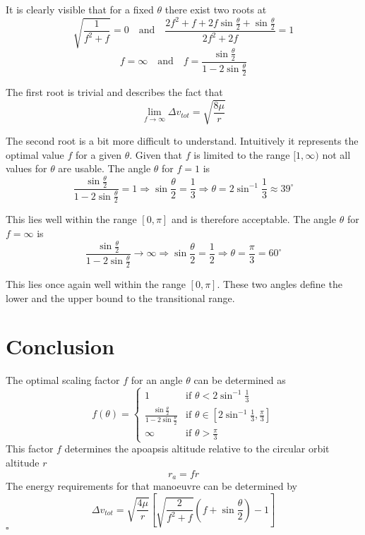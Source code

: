 \documentclass[a4paper, 11pt]{article}
\begin{document}
It is clearly visible that for a fixed $\theta$ there exist two roots at
$$\sqrt{\frac{1}{f^2+f}} = 0 \quad\text{and}\quad  \frac{2f^2+f+2f\sin\frac\theta 2 + \sin\frac\theta 2}{2f^2+2f} =1$$
$$f = \infty \quad \text{and} \quad f = \frac{\sin\frac\theta 2}{1-2\sin\frac\theta 2}$$

The first root is trivial and describes the fact that
$$\lim_{f\to\infty}\Delta v_{tot} = \sqrt{\frac{8\mu}{r}}$$

The second root is a bit more difficult to understand. Intuitively it represents the optimal value $f$ for a given $\theta$.
Given that $f$ is limited to the range $[1,\infty)$ not all values for $\theta$ are usable.
The angle $\theta$ for $f=1$ is
$$\frac{\sin\frac\theta 2}{1-2\sin\frac\theta 2} = 1 \Rightarrow \sin\frac\theta 2 = \frac13 \Rightarrow \theta = 2\sin^{-1}\frac13 \approx 39^\circ$$

This lies well within the range $[0,\pi]$ and is therefore acceptable. The angle $\theta$ for $f=\infty$ is
$$\frac{\sin\frac\theta 2}{1-2\sin\frac\theta 2} \to \infty \Rightarrow \sin\frac\theta2 = \frac12 \Rightarrow \theta = \frac\pi3=60^\circ $$

This lies once again well within the range $[0,\pi]$. These two angles define the lower and the upper bound to the transitional range.

\section{Conclusion}
The optimal scaling factor $f$ for an angle $\theta$ can be determined as
$$
f(\theta) = \begin{cases}
1 & \text{if } \theta < 2\sin^{-1}\frac13\\
\frac{\sin\frac\theta 2}{1-2\sin\frac\theta 2} & \text{if } \theta \in [2\sin^{-1}\frac13,\frac\pi3]\\
\infty & \text{if } \theta > \frac\pi3
\end{cases}$$
This factor $f$ determines the apoapsis altitude relative to the circular orbit altitude $r$
$$r_a = fr$$
The energy requirements for that manoeuvre can be determined by
$$\Delta{}v_{tot}= \sqrt{\frac{4\mu}r}\left[ \sqrt{\frac{2}{f^2 + f}} \left(f + \sin\frac{\theta}2 \right) - 1  \right]$$
\hfill $\square$
\end{document}
